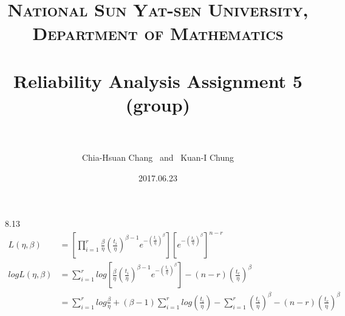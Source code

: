 \documentclass[paper=a4, fontsize=11pt]{scrartcl} %
\title{	
\normalfont \normalsize 
\textsc{National Sun Yat-sen University, Department of Mathematics} \\ [25pt] %
\horrule{0.5pt} \\[0.4cm] %
\huge Reliability Analysis Assignment 5 \\(group)\\ %
\horrule{2pt} \\[0.5cm] %
}
\author{Chia-Hsuan Chang \ and \ Kuan-I Chung} %
\date{\normalsize 2017.06.23} %
\numberwithin{equation}{section} %
\numberwithin{figure}{section} %
\numberwithin{table}{section} %
\begin{document}
\maketitle %

\newpage

8.13
\begin{align*}	
		L(\eta, \beta) 	&= \left[ \prod_{i = 1}^r \frac{\beta}{\eta}\left(\frac{t_i}{\eta} \right)^{\beta - 1} e^{-\left(\frac{t_i}{\eta} \right)^{\beta}}\right]\left[ e^{-\left(\frac{t_c}{\eta} \right)^{\beta}}\right]^{n-r}\\
	logL(\eta, \beta) 	&= 	\sum_{i = 1}^r log\left[\frac{\beta}{\eta}\left(\frac{t_i}{\eta} \right)^{\beta - 1} e^{-\left(\frac{t_i}{\eta} \right)^{\beta}}\right] - (n-r)\left(\frac{t_c}{\eta} \right)^{\beta}\\
					&=	\sum_{i = 1}^r log\frac{\beta}{\eta} + (\beta - 1)\sum_{i =1}^r log\left(\frac{t_i}{\eta} \right)- \sum_{i = 1}^r\left(\frac{t_i}{\eta} \right)^{\beta} - (n-r)\left( \frac{t_c}{\eta} \right)^\beta
\end{align*}
\end{document}
